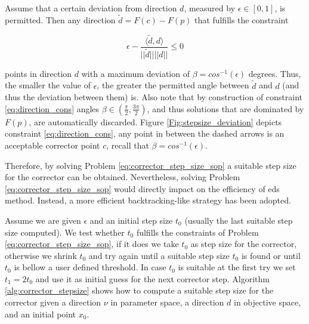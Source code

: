Assume that a certain deviation from direction $d$, measured by $\epsilon \in  [0, 1]$, is permitted. Then any direction $\tilde{d} = F(c) - F(p)$ that fulfills the constraint

\begin{equation}
\epsilon - \frac{\langle \tilde{d}, d \rangle}{|| \tilde{d} || || d ||} \leq 0
\label{eq:direction_cons}
\end{equation}

points in direction $d$ with a maximum deviation of $\beta = cos^{-1}(\epsilon)$ degrees. Thus, the smaller the value of $\epsilon$, the greater the permitted angle between $\tilde{d}$ and $d$ (and thus the deviation between them) is. Also note that by construction of constraint \eqref{eq:direction_cons} angles $\beta \in (\frac{\pi}{2}, \frac{3\pi}{2})$, and thus solutions that are dominated by $F(p)$, are automatically discarded. Figure \ref{Fig:stepsize_deviation} depicts constraint \eqref{eq:direction_cons}, any point in between the dashed arrows is an acceptable corrector point $c$, recall that $\beta = cos^{-1}(\epsilon)$.

\begin{comment}

\begin{figure}[H] 
	\centering \def\svgwidth{150pt} 
	 
	\caption{Acceptable deviations for the corrector $c$} 
	\label{Fig:stepsize_deviation}
\end{figure}

\end{comment}

Therefore, by solving Problem \eqref{eq:corrector_step_size_sop} a suitable step size for the corrector can be obtained. Nevertheless, solving Problem \eqref{eq:corrector_step_size_sop} would directly impact on the efficiency of \gls{eds} method. Instead, a more efficient backtracking-like strategy has been adopted.

Assume we are given $\epsilon$ and an initial step size $t_0$ (usually the last suitable step size computed). We test whether $t_0$ fulfills the constraints of Problem \eqref{eq:corrector_step_size_sop}, if it does we take $t_0$ as step size for the corrector, otherwise we shrink $t_0$ and try again until a suitable step size $t_0$ is found or until $t_0$ is bellow a user defined threshold. In case $t_0$ is suitable at the first try we set $t_1 = 2t_0$ and use it as initial guess for the next corrector step. Algorithm \ref{alg:corrector_stepsize} shows how to compute a suitable step size for the corrector given a direction $\nu$ in parameter space, a direction $d$ in objective space, and an initial point $x_0$.

